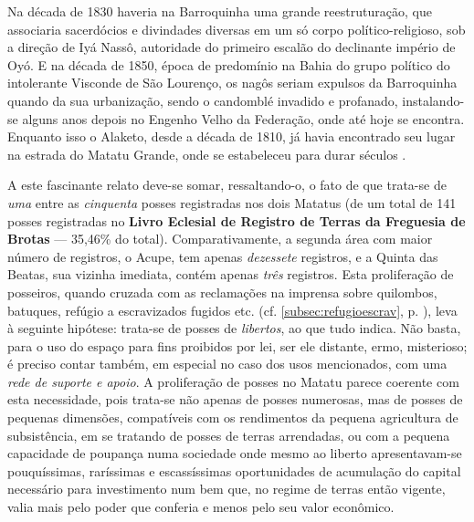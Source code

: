 \begin{citacao}
Na década de 1830 haveria na Barroquinha uma grande reestruturação, que associaria sacerdócios e divindades diversas em um só corpo político-religioso, sob a direção de Iyá Nassô, autoridade do primeiro escalão do declinante império de Oyó. E na década de 1850, época de predomínio na Bahia do grupo político do intolerante Visconde de São Lourenço, os nagôs seriam expulsos da Barroquinha quando da sua urbanização, sendo o candomblé invadido e profanado, instalando-se alguns anos depois no Engenho Velho da Federação, onde até hoje se encontra. Enquanto isso o Alaketo, desde a década de 1810, já havia encontrado seu lugar na estrada do Matatu Grande, onde se estabeleceu para durar séculos \cite[p.~354-356, 369-377]{silveira_alaketo_2003}.
\end{citacao}

A este fascinante relato deve-se somar, ressaltando-o, o fato de que trata-se de \textit{uma} entre as \textit{cinquenta} posses registradas nos dois Matatus (de um total de 141 posses registradas no \textbf{Livro Eclesial de Registro de Terras da Freguesia de Brotas} --- 35,46\% do total). Comparativamente, a segunda área com maior número de registros, o Acupe, tem apenas \textit{dezessete} registros, e a Quinta das Beatas, sua vizinha imediata, contém apenas \textit{três} registros. Esta proliferação de posseiros, quando cruzada com as reclamações na imprensa sobre quilombos, batuques, refúgio a escravizados fugidos etc. (cf. \autoref{subsec:refugioescrav}, p. \pageref{subsec:refugioescrav}), leva à seguinte hipótese: trata-se de posses de \textit{libertos}, ao que tudo indica. Não basta, para o uso do espaço para fins proibidos por lei, ser ele distante, ermo, misterioso; é preciso contar também, em especial no caso dos usos mencionados, com uma \textit{rede de suporte e apoio}. A proliferação de posses no Matatu parece coerente com esta necessidade, pois trata-se não apenas de posses numerosas, mas de posses de pequenas dimensões, compatíveis com os rendimentos da pequena agricultura de subsistência, em se tratando de posses de terras arrendadas, ou com a pequena capacidade de poupança numa sociedade onde mesmo ao liberto apresentavam-se pouquíssimas, raríssimas e escassíssimas oportunidades de acumulação do capital necessário para investimento num bem que, no regime de terras então vigente, valia mais pelo poder que conferia e menos pelo seu valor econômico. 

